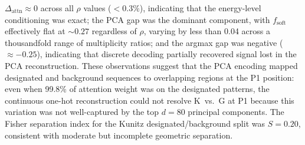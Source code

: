 $\Delta_{\mathrm{attn}} \approx 0$ across all $\rho$ values ($< 0.3\%$), indicating that the
energy-level conditioning was exact; the PCA gap was the dominant component, with
$f_{\mathrm{soft}}$ effectively flat at $\sim\!0.27$ regardless of $\rho$, varying by less than
0.04 across a thousandfold range of multiplicity ratios; and the argmax gap was negative
($\approx -0.25$), indicating that discrete decoding partially recovered signal lost in the PCA
reconstruction. These observations suggest that the PCA
encoding mapped designated and background sequences to overlapping regions at the P1 position:
even when 99.8\% of attention weight was on the designated patterns, the continuous one-hot
reconstruction could not resolve K~vs.~G at P1 because this variation was not well-captured by
the top $d=80$ principal components. The Fisher separation index for the Kunitz
designated/background split was $S = 0.20$, consistent with moderate but incomplete geometric
separation.

